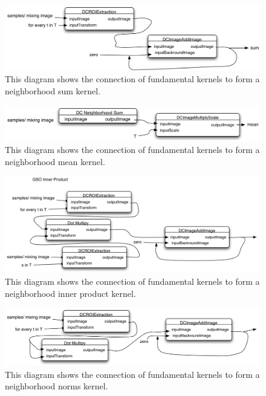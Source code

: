 \documentclass[11pt]{article}
\begin{document}


\begin{figure}[htbp] %
   \centering
   \includegraphics[width=5in]{neighborhoodSum.jpg} 
   \caption{This diagram shows the connection of fundamental kernels to form a neighborhood sum kernel. }
   \label{neighborhoodSum}
\end{figure}


\begin{figure}[htbp] %
   \centering
   \includegraphics[width=5in]{neighborhoodMean.jpg} 
   \caption{This diagram shows the connection of fundamental kernels to form a neighborhood mean kernel. }
   \label{neighborhoodMean}
\end{figure}



\begin{figure}[htbp] %
   \centering
   \includegraphics[width=5in]{neighborhoodInnerProduct.jpg} 
   \caption{This diagram shows the connection of fundamental kernels to form a neighborhood inner product kernel. }
   \label{neighborhoodInnerProduct}
\end{figure}


\begin{figure}[htbp] %
   \centering
   \includegraphics[width=5in]{neighborhoodNorms.jpg} 
   \caption{This diagram shows the connection of fundamental kernels to form a neighborhood norms kernel. }
   \label{neighborhoodNorms}
\end{figure}
\end{document}
